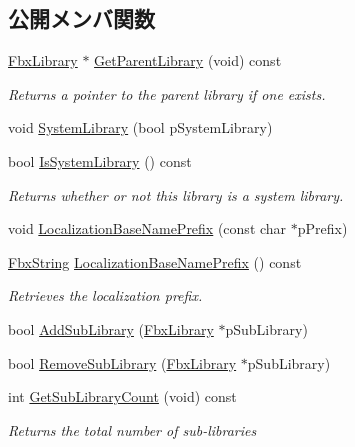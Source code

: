 \subsection*{公開メンバ関数}
\begin{DoxyCompactItemize}
\item 
\hyperlink{class_fbx_library}{Fbx\+Library} $\ast$ \hyperlink{class_fbx_library_a8733a34df39aefd786bd792ee646d3ca}{Get\+Parent\+Library} (void) const
\begin{DoxyCompactList}\small\item\em Returns a pointer to the parent library if one exists. \end{DoxyCompactList}\item 
void \hyperlink{class_fbx_library_a4746780aa4ba19fdbf1462fb371967c9}{System\+Library} (bool p\+System\+Library)
\item 
bool \hyperlink{class_fbx_library_ad0e5e2ea87d5a993ed5a70a27671f9ac}{Is\+System\+Library} () const
\begin{DoxyCompactList}\small\item\em Returns whether or not this library is a system library. \end{DoxyCompactList}\item 
void \hyperlink{class_fbx_library_a31ee4d35fbd0ae97fdb0470a487ae5ff}{Localization\+Base\+Name\+Prefix} (const char $\ast$p\+Prefix)
\item 
\hyperlink{class_fbx_string}{Fbx\+String} \hyperlink{class_fbx_library_acfd1439811766c38c8b3fce758787603}{Localization\+Base\+Name\+Prefix} () const
\begin{DoxyCompactList}\small\item\em Retrieves the localization prefix. \end{DoxyCompactList}\item 
bool \hyperlink{class_fbx_library_a0c3b1e44376fbbad1d85d35aadcedec4}{Add\+Sub\+Library} (\hyperlink{class_fbx_library}{Fbx\+Library} $\ast$p\+Sub\+Library)
\item 
bool \hyperlink{class_fbx_library_af49b9811d383dbdc86bc805b72970ad9}{Remove\+Sub\+Library} (\hyperlink{class_fbx_library}{Fbx\+Library} $\ast$p\+Sub\+Library)
\item 
int \hyperlink{class_fbx_library_aa5c3590309cfdf028cf367f6d9431ce2}{Get\+Sub\+Library\+Count} (void) const
\begin{DoxyCompactList}\small\item\em Returns the total number of sub-\/libraries \end{DoxyCompactList}\item 

\end{DoxyCompactItemize}
